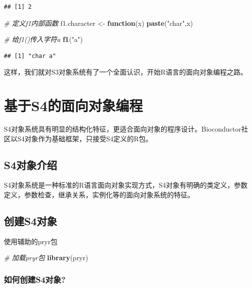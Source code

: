 \documentclass[]{book}
\newenvironment{Shaded}{\begin{snugshade}}{\end{snugshade}}
\newcommand{\KeywordTok}[1]{\textcolor[rgb]{0.13,0.29,0.53}{\textbf{#1}}}
\newcommand{\StringTok}[1]{\textcolor[rgb]{0.31,0.60,0.02}{#1}}
\newcommand{\CommentTok}[1]{\textcolor[rgb]{0.56,0.35,0.01}{\textit{#1}}}
\newcommand{\ControlFlowTok}[1]{\textcolor[rgb]{0.13,0.29,0.53}{\textbf{#1}}}
\newcommand{\NormalTok}[1]{#1}
\begin{document}
\begin{verbatim}
## [1] 2
\end{verbatim}

\begin{Shaded}
\begin{Highlighting}[]
\CommentTok{# 定义f1内部函数}
\NormalTok{f1.character <-}\StringTok{ }\ControlFlowTok{function}\NormalTok{(x) }\KeywordTok{paste}\NormalTok{(}\StringTok{"char"}\NormalTok{,x)}

\CommentTok{# 给f1()传入字符a}
\KeywordTok{f1}\NormalTok{(}\StringTok{"a"}\NormalTok{)}
\end{Highlighting}
\end{Shaded}

\begin{verbatim}
## [1] "char a"
\end{verbatim}

这样，我们就对S3对象系统有了一个全面认识，开始R语言的面向对象编程之路。

\chapter{基于S4的面向对象编程}\label{S4}

S4对象系统具有明显的结构化特征，更适合面向对象的程序设计。Bioconductor社区以S4对象作为基础框架，只接受S4定义的R包。

\section{S4对象介绍}\label{s4}

S4对象系统是一种标准的R语言面向对象实现方式，S4对象有明确的类定义，参数定义，参数检查，继承关系，实例化等的面向对象系统的特征。

\section{创建S4对象}\label{s4}

使用辅助的pryr包

\begin{Shaded}
\begin{Highlighting}[]
\CommentTok{# 加载pryr包}
\KeywordTok{library}\NormalTok{(pryr)}
\end{Highlighting}
\end{Shaded}

\subsection{如何创建S4对象?}\label{s4}
\end{document}
